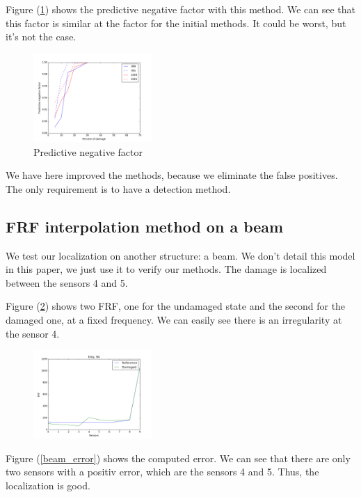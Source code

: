 \documentclass[journal]{IEEEtran}
\begin{document}
Figure (\ref{pred_neg_max}) shows the predictive negative factor with this method. We can see that this factor is similar at the factor for the initial methods. It could be worst, but it's not the case.

\begin{figure}[h!]
  \centering
  \includegraphics[width=0.4\textwidth]{images/pred_neg_max.png}
  \caption{Predictive negative factor}
  \label{pred_neg_max}
\end{figure}

We have here improved the methods, because we eliminate the false positives. The only requirement is to have a detection method.

\subsection{FRF interpolation method on a beam}

We test our localization on another structure: a beam. We don't detail this model in this paper, we just use it to verify our methods. The damage is localized between the sensors 4 and 5.

Figure (\ref{beam_curve}) shows two FRF, one for the undamaged state and the second for the damaged one, at a fixed frequency. We can easily see there is an irregularity at the sensor 4.

\begin{figure}[h!]
  \centering
  \includegraphics[width=0.4\textwidth]{images/poutre_curve2.png}
  \caption{}
  \label{beam_curve}
\end{figure}


Figure (\ref{beam_error}) shows the computed error. We can see that there are only two sensors with a positiv error, which are the sensors 4 and 5. Thus, the localization is good.
\end{document}
